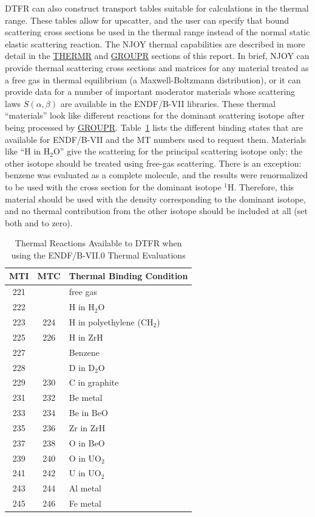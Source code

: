 DTFR can also construct transport tables suitable for calculations
in the thermal range.  These tables allow for upscatter, and the
user can specify that bound scattering cross sections be used in
the thermal range instead of the normal static elastic scattering
reaction.  The NJOY thermal capabilities are described in more
detail in the
\hyperlink{sTHERMRhy}{THERMR} and
\hyperlink{sGROUPRhy}{GROUPR} sections
of this report.  In brief, NJOY can provide thermal scattering
cross sections and matrices for any material treated as a free gas in
thermal equilibrium (a Maxwell-Boltzmann distribution), or it can provide
data for a number of important moderator materials whose scattering
laws $S(\alpha,\beta)$ are available in the ENDF/B-VII libraries.
These thermal ``materials'' look like different reactions for
the dominant scattering isotope after being processed by
\hyperlink{sGROUPRhy}{GROUPR}.
Table~\ref{dtherm} lists the different binding states that are available
for ENDF/B-VII and the MT numbers used to request them.  Materials
like ``H in H$_2$O'' give the scattering for the principal scattering
isotope only; the other isotope should be treated using free-gas
scattering.  There is an exception:  benzene was evaluated as
a complete molecule, and the results were renormalized to be used
with the cross section for the dominant isotope $^{1}$H.
Therefore, this material should be used with the density
corresponding to the dominant isotope, and no thermal contribution from
the other isotope should be included at all (set both  and
 to zero).

\begin{table}\small
\caption[Thermal Reactions Available to DTFR]{Thermal Reactions
   Available to DTFR when using the ENDF/B-VII.0 Thermal Evaluations}
\begin{center}
\begin{tabular}{ccl}
  MTI  &  MTC  &  Thermal Binding Condition \\ \hline
  221  &       &  free gas \\
  222  &       &  H in H$_2$O \\
  223  &  224  &  H in polyethylene (CH$_2$)  \\
  225  &  226  &  H in ZrH  \\
  227  &       &  Benzene \\
  228  &       &  D in D$_2$O \\
  229  &  230  &  C in graphite \\
  231  &  232  &  Be metal \\
  233  &  234  &  Be in BeO  \\
  235  &  236  &  Zr in ZrH \\
  237  &  238  &  O in BeO \\
  239  &  240  &  O in UO$_2$ \\
  241  &  242  &  U in UO$_2$ \\
  243  &  244  &  Al metal \\
  245  &  246  &  Fe metal \\ \hline
\end{tabular}
\end{center}
\label{dtherm}
\end{table}

